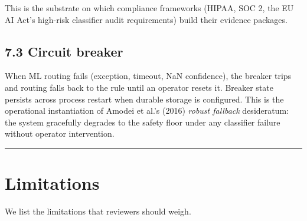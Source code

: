 This is the substrate on which compliance frameworks (HIPAA, SOC 2, the
EU AI Act's high-risk classifier audit requirements) build their
evidence packages.

\subsection{7.3 Circuit breaker}\label{circuit-breaker}

When ML routing fails (exception, timeout, NaN confidence), the breaker
trips and routing falls back to the rule until an operator resets it.
Breaker state persists across process restart when durable storage is
configured. This is the operational instantiation of Amodei et al.'s
(2016) \emph{robust fallback} desideratum: the system gracefully
degrades to the safety floor under any classifier failure without
operator intervention.

\begin{center}\rule{0.5\linewidth}{0.5pt}\end{center}

\section{Limitations}\label{limitations}

We list the limitations that reviewers should weigh.

